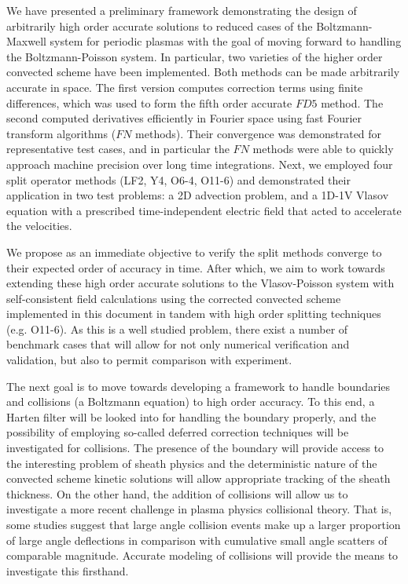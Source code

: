 \documentclass[11pt,titlepage]{report}
\begin{document}
\indent\indent We have presented a preliminary framework demonstrating the design of arbitrarily high order accurate solutions to reduced cases of the Boltzmann-Maxwell system for periodic plasmas with the goal of moving forward to handling the Boltzmann-Poisson system. In particular, two varieties of the higher order convected scheme have been implemented. Both methods can be made arbitrarily accurate in space. The first version computes correction terms using finite differences, which was used to form the fifth order accurate $FD5$ method. The second computed derivatives efficiently in Fourier space using fast Fourier transform algorithms ($FN$ methods). Their convergence was demonstrated for representative test cases, and in particular the $FN$ methods were able to quickly approach machine precision over long time integrations. Next, we employed four split operator methods (LF2, Y4, O6-4, O11-6) and demonstrated their application in two test problems: a 2D advection problem, and a 1D-1V Vlasov equation with a prescribed time-independent electric field that acted to accelerate the velocities.

We propose as an immediate objective to verify the split methods converge to their expected order of accuracy in time. After which, we aim to work towards extending these high order accurate solutions to the Vlasov-Poisson system with self-consistent field calculations using the corrected convected scheme implemented in this document in tandem with high order splitting techniques (e.g. O11-6). As this is a well studied problem, there exist a number of benchmark cases that will allow for not only numerical verification and validation, but also to permit comparison with experiment. 

The next goal is to move towards developing a framework to handle boundaries and collisions (a Boltzmann equation) to high order accuracy. To this end, a Harten filter will be looked into for handling the boundary properly, and the possibility of employing so-called deferred correction techniques will be investigated for collisions. The presence of the boundary will provide access to the interesting problem of sheath physics and the deterministic nature of the convected scheme kinetic solutions will allow appropriate tracking of the sheath thickness. On the other hand, the addition of collisions will allow us to investigate a more recent challenge in plasma physics collisional theory. That is, some studies suggest that large angle collision events make up a larger proportion of large angle deflections in comparison with cumulative small angle scatters of comparable magnitude. Accurate modeling of collisions will provide the means to investigate this firsthand. 
\end{document}
